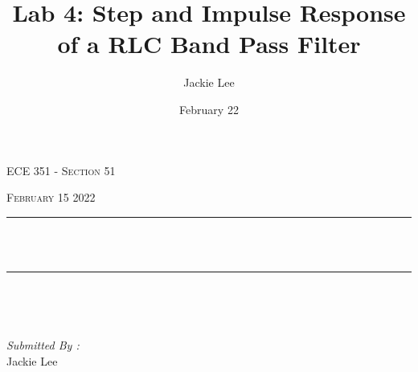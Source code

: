 \documentclass[12pt]{report}
\title{Lab 4: Step and Impulse Response of a RLC Band Pass Filter}
\author{ Jackie Lee}
\date{February 22}
\makeatletter
\let\thetitle\@title
\makeatother
\begin{document}

\begin{titlepage}
	\centering
    \vspace*{0.5 cm}
\begin{center}    \textsc{\Large   ECE 351 - Section 51 }\\[2.0 cm]	\end{center}%
	\textsc{\Large February 15 2022  }\\[0.5 cm]				%
	\rule{\linewidth}{0.2 mm} \\[0.4 cm]
	{ \huge \bfseries \thetitle}\\
	\rule{\linewidth}{0.2 mm} \\[1.5 cm]
	
	\begin{minipage}{0.4\textwidth}
		\begin{flushleft} \large
			\end{flushleft}
			\end{minipage}~
			\begin{minipage}{0.4\textwidth}
            
			\begin{flushright} \large
			\emph{Submitted By :} \\
			Jackie Lee  
		\end{flushright}
           
	\end{minipage}\\[2 cm]
	
    
    
    
    
	
\end{titlepage}


\tableofcontents
\pagebreak

\renewcommand{\thesection}{\arabic{section}}
\end{document}
